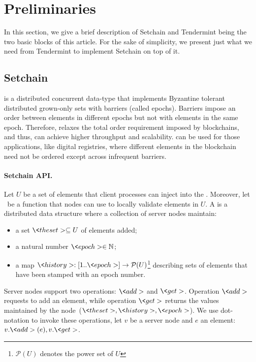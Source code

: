\section{Preliminaries}\label{sec:prelim}

In this section, we give a brief description of Setchain and Tendermint being
the two basic blocks of this article.
%
For the sake of simplicity, we present just what we need from Tendermint to
implement Setchain on top of it.

\subsection{Setchain}
\setchain \cite{Capretto.2022.Setchain} is a distributed concurrent data-type
that implements Byzantine tolerant distributed grown-only sets with barriers
(called epochs).
%
Barriers impose an order between elements in different epochs but not with
elements in the same epoch.
%
Therefore, \setchain relaxes the total order requirement imposed by blockchains,
and thus, can achieve higher throughput and scalability.
%
\setchain can be used for those applications, like digital
registries, where different elements in the blockchain need not be
ordered except across infrequent barriers.

\paragraph*{Setchain API.}
%
Let \(U\) be a set of elements that client processes can inject into the
\setchain.
%
Moreover, let \isValidElement\ be a function that nodes can use to locally
validate elements in \(U\).
%
A \setchain is a distributed data structure where a collection of server nodes
maintain:
\begin{itemize}
\item a set $\<theset> \subseteq U$ of elements added;
\item a natural number $\<epoch> \in \mathbb{N}$;
\item a map $\<history> : [1..\<epoch>] \rightarrow \mathcal{P}(U)$\footnote{$\mathcal{P}(U)$ denotes the
power set of $U$} describing sets of elements that have been stamped with an
epoch number.
\end{itemize}
%
Server nodes support two operations: \(\<add>\) and \(\<get>\).
%
Operation \(\<add>\) requests to add an element, while operation \(\<get>\)
returns the values maintained by the node~(\(\<theset>,\<history>,\<epoch>\)).
%
We use dot-notation to invoke these operations, let \(v\) be a server node and
\(e\) an element: \(v.\<add>(e),v.\<get>\).

